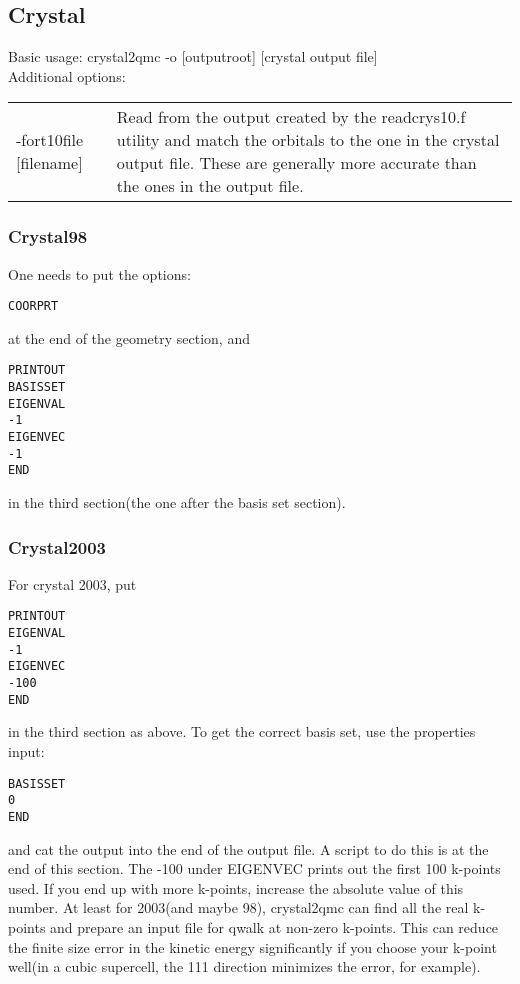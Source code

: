 \documentclass[12pt]{article}
\begin{document}
\subsection{Crystal}


Basic usage:  crystal2qmc -o [outputroot]  [crystal output file] \\
Additional options: \\
\begin{tabular}{lp{8cm}}
-fort10file [filename]  &  Read from the output created by the 
readcrys10.f utility and match the orbitals to the one in
the crystal output file.  These are generally more accurate than the ones
in the output file. \\
\end{tabular}



\subsubsection{Crystal98}

One needs to put the options: \\
\begin{verbatim}
COORPRT
\end{verbatim}
at the end of the geometry section, and \\
\begin{verbatim}
PRINTOUT
BASISSET
EIGENVAL
-1
EIGENVEC
-1
END
\end{verbatim}
in the third section(the one after the basis set section). 

\subsubsection{Crystal2003}

 For crystal 2003, put 
\begin{verbatim}
PRINTOUT
EIGENVAL
-1
EIGENVEC
-100
END
\end{verbatim}
in the third section as above.  To get the correct basis set, use the properties input: \\
\begin{verbatim}
BASISSET
0
END
\end{verbatim}
and cat the output into the end of the output file.  A script to do this is at the end of this section.
The -100 under EIGENVEC prints out the first 100 k-points used.  If you end up with more k-points, 
increase the absolute value of this number.  At least for 2003(and maybe 98), crystal2qmc can find all the
real k-points and prepare an input file for qwalk at non-zero k-points.  This can reduce the finite
size error in the kinetic energy significantly if you choose your k-point well(in a cubic supercell, the 
111 direction minimizes the error, for example).
\end{document}
